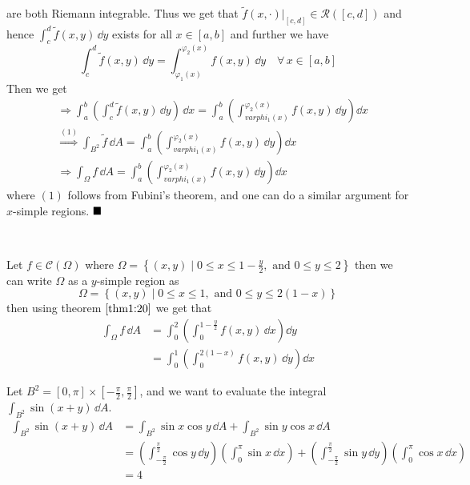 \documentclass[Analysis-3]{subfiles}
\begin{document}
are both Riemann integrable. Thus we get that $\tilde{f}(x,\cdot)\vert_{[c,d]} \in \mathscr{R}([c,d])$ and hence $\displaystyle{\int_c^d \tilde{f}(x,y) \, \dd y}$ exists for all $x \in [a,b]$ and further we have 
\[
    \int_c^d \tilde{f}(x,y) \, \dd y = \int_{\varphi_1(x)}^{\varphi_2(x)} f(x,y) \, \dd y \quad \forall \, x \in [a,b]    
\]
Then we get 
\begin{align*}
    &\Longrightarrow \int_a^b \left( \int_c^d \tilde{f}(x,y) \, \dd y\right)\, \dd x = \int_a^b \left( \int_{varphi_1(x)}^{\varphi_2(x)} f(x,y) \, \dd y\right) \dd x \\ 
    &\overset{(1)}{\Longrightarrow} \int_{B^2} \tilde{f} \, \dd A = \int_a^b \left( \int_{varphi_1(x)}^{\varphi_2(x)} f(x,y) \, \dd y\right) \dd x \\ 
    &\Longrightarrow \int_{\Omega} f \, \dd A = \int_a^b \left( \int_{varphi_1(x)}^{\varphi_2(x)} f(x,y) \, \dd y\right) \dd x
\end{align*}
where $(1)$ follows from Fubini's theorem, and one can do a similar argument for $x$-simple regions. $\hfill \blacksquare$

\

\begin{Eg}{}{}
    Let $f \in \mathscr{C}(\Omega)$ where $\Omega = \left\{ (x,y) \mid 0 \leq x \leq 1 - \frac{y}{2}, \mbox{ and } 0 \leq y \leq 2 \right\}$ then we can write $\Omega$ as a $y$-simple region as 
    \[
        \Omega = \left\{ (x,y) \mid 0 \leq x \leq 1, \mbox{ and } 0 \leq y \leq 2(1-x) \right\}    
    \]
    then using theorem $\ref{thm1:20}$ we get that 
    \begin{align*}
        \int_{\Omega} f \, \dd A &= \int_0^2 \left( \int_0^{1-\frac{y}{2}} f(x,y) \, \dd x\right) \dd y \\ 
        &= \int_0^1 \left( \int_0^{2(1-x)} f(x,y) \, \dd y\right) \dd x
    \end{align*}
\end{Eg}

\begin{Eg}{}{}
    Let $B^2 = [0,\pi] \times [-\frac{\pi}{2}, \frac{\pi}{2}]$, and we want to evaluate the integral $\int_{B^2} \sin (x+y) \, \dd A$. 
    \begin{align*}
        \int_{B^2}\sin(x+y) \, \dd A &= \int_{B^2} \sin x \cos y \, \dd A + \int_{B^2} \sin y \cos x \, \dd A \\ 
        &= \left( \int_{-\frac{\pi}{2}}^{\frac{\pi}{2}} \cos y \, \dd y\right)\left( \int_{0}^{\pi} \sin x \, \dd x\right) + \left( \int_{-\frac{\pi}{2}}^{\frac{\pi}{2}} \sin y \, \dd y\right)\left( \int_{0}^{\pi} \cos x \, \dd x\right) \\ 
        &= 4 
    \end{align*}
\end{Eg}
\end{document}
